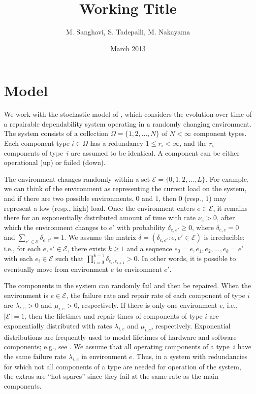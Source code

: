 \documentclass[12pt]{article}
\author{M. Sanghavi, S. Tadepalli, M. Nakayama}
\date{March 2013}
\begin{document}
\title{Working Title}
\maketitle

\section{Model}
\label{sec:model}

We work with the stochastic model of \cite{ING:2009}, which considers the
evolution over time of a repairable dependability system operating in a randomly
changing environment. The system consists of a collection $\Omega = \{ 1, 2,
\ldots, N \}$ of $N < \infty$ component types. Each component type $i \in
\Omega$ has a redundancy $1 \leq r_i < \infty$, and the $r_i$ components of
type~$i$ are assumed to be identical. A component can be either operational (up)
or failed (down).

The environment changes randomly within a set $\mathcal{E} = \{ 0, 1, 2, \ldots,
L \}$. For example, we can think of the environment as representing the current
load on the system, and if there are two possible environments, $0$ and $1$,
then $0$ (resp., $1$) may represent a low (resp., high) load. Once the
environment enters $e \in \mathcal{E}$, it remains there for an exponentially
distributed amount of time with rate $\nu_e > 0$, after which the environment
changes to $e'$ with probability $\delta_{e, e'} \geq 0$, where $\delta_{e, e} =
0$ and $\sum_{e' \in \mathcal{E}} \delta_{e, e'} = 1$. We assume the matrix
$\delta = (\delta_{e, e'} : e, e' \in \mathcal{E})$ is irreducible; i.e., for
each $e, e' \in \mathcal{E}$, there exists $k \geq 1$ and a sequence $e_0 = e,
e_1, e_2, \ldots, e_k = e'$ with each $e_i \in \mathcal{E}$ such that $\prod_{i
= 0}^{k-1} \delta_{e_i, e_{i + 1}} > 0$. In other words, it is possible to
eventually move from environment $e$ to environment $e'$.

The components in the system can randomly fail and then be repaired. When the
environment is $e \in \mathcal{E}$, the failure rate and repair rate of each
component of type $i$ are $\lambda_{i, e} > 0$ and $\mu_{i, e} > 0$,
respectively.  If there is only one environment $e$, i.e., $| \mathcal{E} | =
1$, then the lifetimes and repair times of components of type $i$ are
exponentially distributed with rates $\lambda_{i, e}$ and $\mu_{i, e}$,
respectively. Exponential distributions are frequently used to model lifetimes
of hardware and software components; e.g., see \cite{XDP:2004}. We assume that
all operating components of a type~$i$ have the same failure rate $\lambda_{i,
e}$ in environment $e$. Thus, in a system with  redundancies for which not all
components of a type are needed for operation of the system, the extras are
``hot spares'' since they fail at the same rate as the main components.
\end{document}
